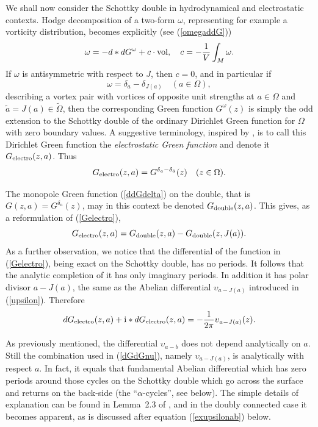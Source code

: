 \documentclass[reqno,12pt]{article}
\theoremstyle{plain}
\theoremstyle{definition}
\numberwithin{equation}{section}
\numberwithin{figure}{section}
\def\I{\mathrm{i}}
\begin{document}
We shall now consider the Schottky double in hydrodynamical and electrostatic contexts.
Hodge decomposition of a two-form $\omega$, representing for example a vorticity distribution, 
becomes explicitly (see (\ref{omegaddG}))
\begin{equation*}\label{Hodgeomega1}
\omega =-d*dG^{\omega} + c\cdot {{\rm vol}}, \quad c=-\frac{1}{V}\int_M \omega.
\end{equation*}
If $\omega$ is antisymmetric with respect to $J$, then $c=0$, and in particular if 
$$
\omega=\delta_a -\delta_{J(a)} \quad (a\in \Omega),
$$
describing a vortex pair with vortices of opposite unit strengths at $a\in\Omega$ and $\tilde{a}=J(a)\in \tilde\Omega$,
then the corresponding Green function $G^\omega(z)$  is simply the odd
extension to the Schottky double of the ordinary Dirichlet Green function for  $\Omega$ with zero
boundary values. 
A suggestive terminology, inspired by  \cite{Cohn-1980},  is to call this Dirichlet Green function 
the {\it electrostatic Green function} and denote it $G_{\rm electro}(z,a)$. Thus
\begin{equation}\label{Gelectro}
G_{\rm electro}(z,a)=G^{\delta_a-\delta_{\tilde{a}}}(z)\quad (z\in\Omega).
\end{equation}

The monopole Green function (\ref{ddGdelta}) on the double, that is $G(z,a)=G^{\delta_a}(z)$, may in this context be denoted
$G_{\rm double}(z,a)$. This gives, as a reformulation of (\ref{Gelectro}),
\begin{equation}\label{GGG}
G_{\rm electro}(z,a)= G_{\rm double}(z,a)-G_{\rm double} (z,J(a)).
\end{equation}
As a further observation, we notice that the differential of the function in (\ref{Gelectro}), being exact on the Schottky double,
has no periods. It follows that the analytic completion of it has only imaginary periods. In addition it has
polar divisor $a-J(a)$, the same as the Abelian differential $\upsilon_{a-J(a)}$ introduced in (\ref{upsilon}). Therefore
\begin{equation}\label{dGdGnu}
dG_{\rm electro}(z,a)+\I*dG_{\rm electro}(z,a)=-\frac{1}{2\pi}\upsilon_{a-J(a)}(z).
\end{equation}

As previously mentioned, the differential  $\upsilon_{a-b}$ does not depend analytically
on $a$. Still the combination used in (\ref{dGdGnu}), namely $\upsilon_{a-J(a)}$, 
is analytically with respect $a$. In fact, it equals that fundamental Abelian differential
which has zero periods around those cycles on the Schottky double which go across the surface and
returns on the back-side (the ``$\alpha$-cycles'', see below).
The simple details of explanation can be found in  Lemma~2.3 of \cite{Gustafsson-Sebbar-2012}, and in the doubly connected 
case it becomes apparent, as is discussed after equation (\ref{exupsilonab}) below.
\end{document}
